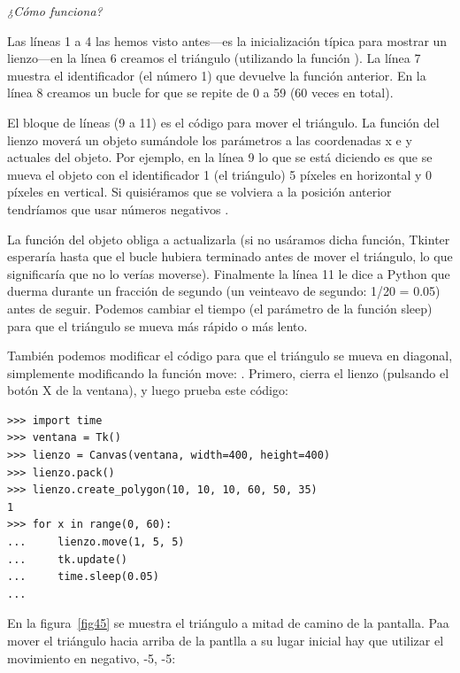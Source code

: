 \par
\emph{¿Cómo funciona?}
\par
Las líneas 1 a 4 las hemos visto antes---es la inicialización típica para mostrar un lienzo---en la línea 6 creamos el triángulo (utilizando la función ). La línea 7 muestra el identificador (el número 1) que devuelve la función anterior. En la línea 8 creamos un bucle for que se repite de 0 a 59 (60 veces en total).

El bloque de líneas (9 a 11) es el código para mover el triángulo. La función  del lienzo moverá un objeto sumándole los parámetros a las coordenadas x e y actuales del objeto.  Por ejemplo, en la línea 9 lo que se está diciendo es que se mueva el objeto con el identificador 1 (el triángulo) 5 píxeles en horizontal y 0 píxeles en vertical.  Si quisiéramos que se volviera a la posición anterior tendríamos que usar números negativos .
 
La función  del objeto  obliga a actualizarla (si no usáramos dicha función, Tkinter esperaría hasta que el bucle hubiera terminado antes de mover el triángulo, lo que significaría que no lo verías moverse). Finalmente la línea 11 le dice a Python que duerma durante un fracción de segundo (un veinteavo de segundo: 1/20 = 0.05) antes de seguir. Podemos cambiar el tiempo (el parámetro de la función sleep) para que el triángulo se mueva más rápido o más lento.

También podemos modificar el código para que el triángulo se mueva en diagonal, simplemente modificando la función move: .  Primero, cierra el lienzo (pulsando el botón X de la ventana), y luego prueba este código:

\begin{listingignore}
\begin{verbatim}
>>> import time
>>> ventana = Tk()
>>> lienzo = Canvas(ventana, width=400, height=400)
>>> lienzo.pack()
>>> lienzo.create_polygon(10, 10, 10, 60, 50, 35)
1
>>> for x in range(0, 60):
...     lienzo.move(1, 5, 5)
...     tk.update()
...     time.sleep(0.05)
...
\end{verbatim}
\end{listingignore}

En la figura~\ref{fig45} se muestra el triángulo a mitad de camino de la pantalla. Paa mover el triángulo hacia arriba de la pantlla a su lugar inicial hay que utilizar el movimiento en negativo, -5, -5:

